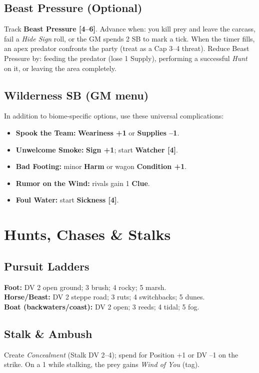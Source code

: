 \documentclass[11pt]{article}
\begin{document}
\subsection{Beast Pressure (Optional)}
Track \textbf{Beast Pressure [4--6]}. Advance when: you kill prey and leave the carcass, fail a \emph{Hide Sign} roll, or the GM spends 2 SB to mark a tick. When the timer fills, an apex predator confronts the party (treat as a Cap 3--4 threat). Reduce Beast Pressure by: feeding the predator (lose 1 Supply), performing a successful \emph{Hunt} on it, or leaving the area completely.

\subsection{Wilderness SB (GM menu)}\label{sec:sb}
In addition to biome-specific options, use these universal complications:
\begin{itemize}
  \item \textbf{Spook the Team:} \textbf{Weariness +1} or \textbf{Supplies --1}.
  \item \textbf{Unwelcome Smoke:} \textbf{Sign +1}; start \textbf{Watcher [4]}.
  \item \textbf{Bad Footing:} minor \textbf{Harm} or wagon \textbf{Condition +1}.
  \item \textbf{Rumor on the Wind:} rivals gain 1 \textbf{Clue}.
  \item \textbf{Foul Water:} start \textbf{Sickness [4]}.
\end{itemize}

\section{Hunts, Chases \& Stalks}
\subsection{Pursuit Ladders}
\textbf{Foot:} DV 2 open ground; 3 brush; 4 rocky; 5 marsh.\\
\textbf{Horse/Beast:} DV 2 steppe road; 3 ruts; 4 switchbacks; 5 dunes.\\
\textbf{Boat (backwaters/coast):} DV 2 open; 3 reeds; 4 tidal; 5 fog.

\subsection{Stalk \& Ambush}
Create \emph{Concealment} (Stalk DV 2--4); spend for Position +1 or DV --1 on the strike. On a 1 while stalking, the prey gains \emph{Wind of You} (tag).
\end{document}
